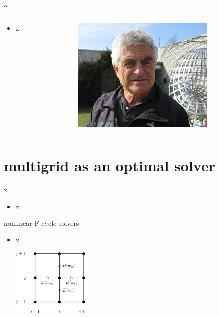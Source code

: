 \documentclass[10pt,
               svgnames,
               hyperref={colorlinks,citecolor=DeepPink4,linkcolor=FireBrick,urlcolor=Maroon},
               usepdftitle=false]{beamer}
\begin{document}
\begin{frame}{x}
\begin{columns}
\begin{column}{0.8\textwidth}
\begin{itemize}
\item x
\end{itemize}
\end{column}
\begin{column}{0.17\textwidth}
\hfill \includegraphics[width=\textwidth]{images/abrandt.jpg}
\end{column}
\end{columns}
\end{frame}



\section{multigrid as an optimal solver}

\begin{frame}{x}
\begin{itemize}
\item x
\end{itemize}
\end{frame}

\begin{frame}{nonlinear F-cycle solvers}
\begin{itemize}
\item x

\hfill \includegraphics[width=0.3\textwidth]{images/msboxstencil.png}
\end{itemize}
\end{frame}
\end{document}
